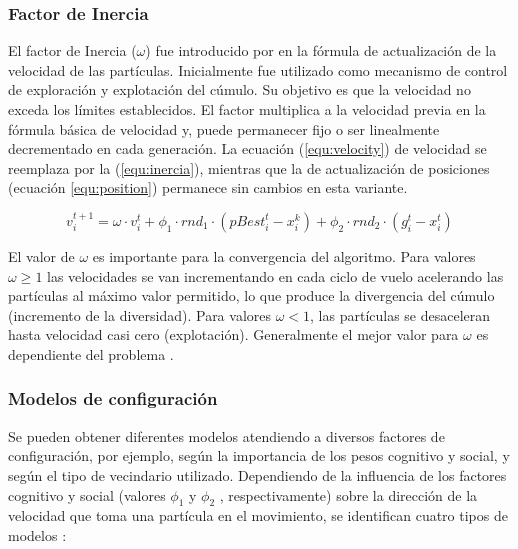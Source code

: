     \subsubsection{Factor de Inercia}

    El factor de Inercia ($\omega$) fue introducido por \cite{citeulike33} en la f\'ormula de actualizaci\'on de 
    la velocidad de las part\'iculas. Inicialmente fue utilizado como mecanismo de control de exploraci\'on y explotaci\'on 
    del c\'umulo. Su objetivo es que la velocidad no exceda los l\'imites establecidos. El factor multiplica a la velocidad 
    previa en la f\'ormula b\'asica de velocidad y, puede permanecer fijo o ser linealmente decrementado en cada generaci\'on. 
    La ecuaci\'on (\ref{equ:velocity}) de velocidad se reemplaza por la (\ref{equ:inercia}), mientras que la de actualizaci\'on de 
    posiciones (ecuaci\'on \ref{equ:position}) permanece sin cambios en esta variante.

     \begin{equation}
	  v^{t+1}_{i} = \omega \cdot v^t_i + \phi_1 \cdot rnd_1 \cdot \left(pBest^t_i - x^k_i \right) 
					    + \phi_2 \cdot rnd_2 \cdot \left(g^t_i - x^t_i \right) 
      \label{equ:inercia}
      \end{equation}
    
    El valor de $\omega$ es importante para la convergencia del algoritmo. Para valores $\omega \geq 1$ las velocidades se 
    van incrementando en cada ciclo de vuelo acelerando las part\'iculas al m\'aximo valor permitido, lo que produce la 
    divergencia del c\'umulo (incremento de la diversidad). Para valores $\omega < 1$, las part\'iculas se desaceleran 
    hasta velocidad casi cero (explotaci\'on). Generalmente el mejor valor para $\omega$ es dependiente del problema 
    \cite{Shi_Eberhart_1998}.

    \subsubsection{Modelos de configuraci\'on}
    
    Se pueden obtener diferentes modelos atendiendo a diversos factores de configuraci\'on, por ejemplo, seg\'un la importancia de los 
    pesos cognitivo y social, y seg\'un el tipo de vecindario utilizado. Dependiendo de la influencia de los factores cognitivo y social 
    (valores $\phi_1$ y $\phi_2$ , respectivamente) sobre la direcci\'on de la velocidad que toma una part\'icula en el movimiento, se 
    identifican cuatro tipos de modelos \cite{JKennedy11}:
    
